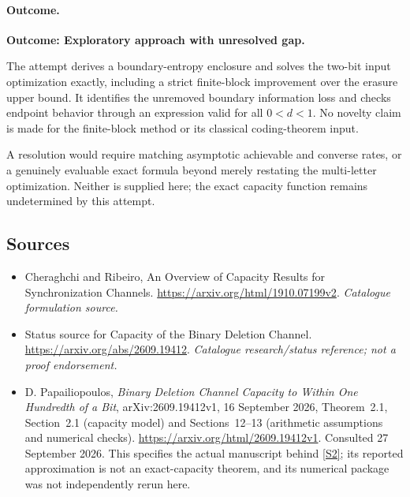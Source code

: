 \documentclass[11pt,a4paper]{article}
\newcommand{\sref}[2]{\hyperlink{source:#1:#2}{[S#2]}}
\numberwithin{equation}{section}
\begin{document}
\paragraph{Outcome.}
\textbf{Outcome: Exploratory approach with unresolved gap.}

The attempt derives a boundary-entropy enclosure and solves the two-bit
input optimization exactly, including a strict finite-block improvement
over the erasure upper bound. It identifies the unremoved boundary
information loss and checks endpoint behavior through an expression
valid for all $0<d<1$. No novelty claim is made for the finite-block
method or its classical coding-theorem input.

A resolution would require matching asymptotic achievable and converse
rates, or a genuinely evaluable exact formula beyond merely restating
the multi-letter optimization. Neither is supplied here; the exact
capacity function remains undetermined by this attempt.
\subsection{Sources}
\begin{itemize}\raggedright
\item[\textnormal{[S1]}]\hypertarget{source:30006798:1}{} Cheraghchi and Ribeiro, An Overview of Capacity Results for Synchronization Channels.
\url{https://arxiv.org/html/1910.07199v2}.
{\small\textit{Catalogue formulation source.}}
\item[\textnormal{[S2]}]\hypertarget{source:30006798:2}{} Status source for Capacity of the Binary Deletion Channel.
\url{https://arxiv.org/abs/2609.19412}.
{\small\textit{Catalogue research/status reference; not a proof endorsement.}}
\item[\textnormal{[E1]}]\hypertarget{extra:30006798:1}{}
D. Papailiopoulos, \emph{Binary Deletion Channel Capacity to Within One
Hundredth of a Bit}, arXiv:2609.19412v1, 16 September 2026,
Theorem~2.1, Section~2.1 (capacity model) and Sections~12--13
(arithmetic assumptions and numerical checks).
\url{https://arxiv.org/html/2609.19412v1}.
Consulted 27 September 2026. This specifies the actual manuscript behind
\sref{30006798}{2}; its reported approximation is not an exact-capacity theorem,
and its numerical package was not independently rerun here.
\end{itemize}
\end{document}
